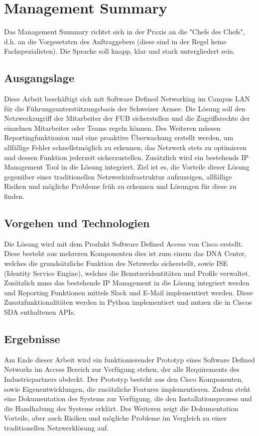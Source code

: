 \section{Management Summary}
Das Management Summary richtet sich in der Praxis an die "Chefs des Chefs", d.h. an die Vorgesetzten des Auftraggebers (diese sind in der Regel keine Fachspezialisten). Die Sprache soll knapp, klar und stark untergliedert sein.

\subsection{Ausgangslage}
Diese Arbeit beschäftigt sich mit Software Defined Networking im Campus LAN für die Führungsunterstützungsbasis der Schweizer Armee. Die Lösung soll den Netzwerkzugriff der Mitarbeiter der FUB sicherstellen und die Zugriffsrechte der einzelnen Mitarbeiter oder Teams regeln können. 
Des Weiteren müssen Reportingfunktionion und eine proaktive Überwachung erstellt werden, um allfällige Fehler schnellstmöglich zu erkennen, das Netzwerk stets zu optimieren und dessen Funktion jederzeit sicherzustellen.
Zusätzlich wird ein bestehends IP Management Tool in die Lösung integriert. 
Ziel ist es, die Vorteile dieser Lösung gegenüber einer traditionellen Netzwerkinfrastruktur aufzuzeigen, allfällige Risiken und mögliche Probleme früh zu erkennen und Lösungen für diese zu finden. 
\subsection{Vorgehen und Technologien}
Die Lösung wird mit dem Produkt Software Defined Access von Cisco erstellt. Diese besteht aus mehreren Komponenten dies ist zum einem das DNA Center, welches die grundsätzliche Funktion des Netzwerks sicherstellt, sowie ISE (Identity Service Engine), welches die Benutzeridentitäten und Profile verwaltet.
Zusätzlich muss das bestehende IP Management in die Lösung integriert werden und Reporting Funktionen mittels Slack und E-Mail implementiert werden. Diese Zusatzfunktionalitäten werden in Python implementiert und nutzen die in Ciscos SDA enthaltenen APIs.
\subsection{Ergebnisse}
Am Ende dieser Arbeit wird ein funktionierender Prototyp eines Software Defined Networks im Access Bereich zur Verfügung stehen, der alle Requirements des Industriepartners abdeckt. Der Prototyp besteht aus den Cisco Komponenten, sowie Eigenentwicklungen, die zusätzliche Features implementieren. 
Zudem steht eine Dokumentation des Systems zur Verfügung, die den Installationsprozess und die Handhabung des Systems erklärt. Des Weiteren zeigt die Dokumentation Vorteile, aber auch Risiken und mögliche Probleme im Vergleich zu einer traditionellen Netzwerklösung auf.
